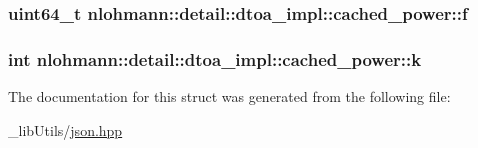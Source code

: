 \subsubsection[{\texorpdfstring{f}{f}}]{\setlength{\rightskip}{0pt plus 5cm}uint64\+\_\+t nlohmann\+::detail\+::dtoa\+\_\+impl\+::cached\+\_\+power\+::f}\hypertarget{structnlohmann_1_1detail_1_1dtoa__impl_1_1cached__power_a56a47ff88dce47986dd938f2ccb2abbf}{}\label{structnlohmann_1_1detail_1_1dtoa__impl_1_1cached__power_a56a47ff88dce47986dd938f2ccb2abbf}
\subsubsection[{\texorpdfstring{k}{k}}]{\setlength{\rightskip}{0pt plus 5cm}int nlohmann\+::detail\+::dtoa\+\_\+impl\+::cached\+\_\+power\+::k}\hypertarget{structnlohmann_1_1detail_1_1dtoa__impl_1_1cached__power_a8c1f2efed643eeaa8fae83c697a29c6a}{}\label{structnlohmann_1_1detail_1_1dtoa__impl_1_1cached__power_a8c1f2efed643eeaa8fae83c697a29c6a}


The documentation for this struct was generated from the following file\+:\begin{DoxyCompactItemize}
\item 
\+\_\+lib\+Utils/\hyperlink{json_8hpp}{json.\+hpp}\end{DoxyCompactItemize}
